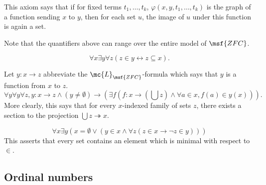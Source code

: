 \documentclass[11pt]{article}
\begin{document}
{\begin{description}
  This axiom says that if for fixed terms $t_1, \dots, t_k$, $\varphi(x,y,t_1, \dots, t_k)$ is the graph of a function sending $x$ to $y$, then for each set $u$, the image of $u$ under this function is again a set.

  Note that the quantifiers above can range over the entire model of $\msf{ZFC}$.

\item[Powerset] \label{zfc-powerset}
  $$
\forall x \exists y \forall z (z \in y \leftrightarrow z \subseteq x).
$$
\item[Choice] \label{zfc-choice} Let $y : x \to z$ abbreviate the $\mc{L}_{\msf{ZFC}}$-formula which says that $y$ is a function from $x$ to $z$.
  $$
\forall y \forall y \forall z, y : x \to z \wedge (y \neq \emptyset) \rightarrow \left( \exists f (f : x \to (\bigcup z) \wedge \forall a \in x, f(a) \in y(x)) \right).
  $$
More clearly, this says that for every $x$-indexed family of sets $z$, there exists a section to the projection $\bigcup z \twoheadrightarrow x$.
\item[Regularity] \label{zfc-regularity}
  $$
\forall x \exists y  (x = \emptyset \lor (y \in x \wedge \forall z (z \in x \to \neg z \in y)))
$$
This asserts that every set contains an element which is minimal with respect to $\in$.
\end{description}
}

\subsection{Ordinal numbers}

\end{document}
